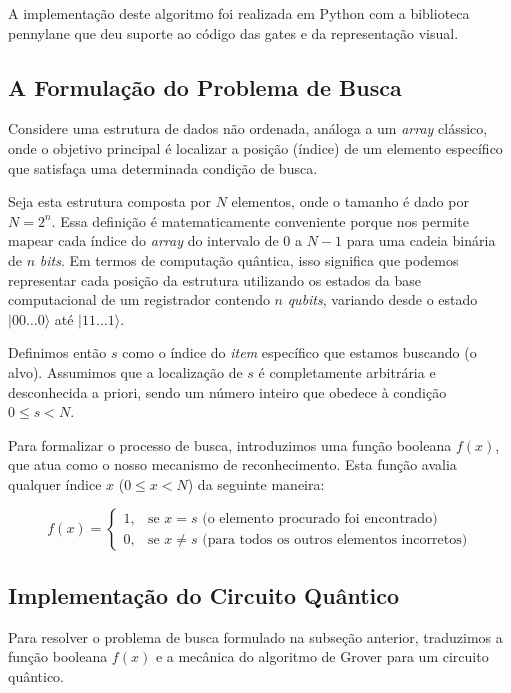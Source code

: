\documentclass{llncs}
\begin{document}
A implementação deste algoritmo foi realizada em Python com a biblioteca pennylane que deu suporte ao código das gates e da representação 
visual.

\subsection{A Formulação do Problema de Busca}

Considere uma estrutura de dados não ordenada, análoga a um \textit{array} clássico, onde o objetivo principal é localizar a posição (índice) de um elemento específico que satisfaça uma determinada condição de busca. 

Seja esta estrutura composta por $N$ elementos, onde o tamanho é dado por $N = 2^n$. Essa definição é matematicamente conveniente porque nos permite mapear cada índice do \textit{array}  do intervalo de $0$ a $N-1$ para uma cadeia binária de $n$ \textit{bits}. Em termos de computação quântica, isso significa que podemos representar cada posição da estrutura utilizando os estados da base computacional de um registrador contendo $n$ \textit{qubits}, variando desde o estado $|00\dots0\rangle$ até $|11\dots1\rangle$.

Definimos então $s$ como o índice do \textit{item} específico que estamos buscando (o alvo). Assumimos que a localização de $s$ é completamente arbitrária e desconhecida a priori, sendo um número inteiro que obedece à condição $0 \leq s < N$. 

Para formalizar o processo de busca, introduzimos uma função booleana $f(x)$, que atua como o nosso mecanismo de reconhecimento. Esta função avalia qualquer índice $x$ ($0 \leq x < N$) da seguinte maneira:

\begin{equation}
    f(x) = 
    \begin{cases} 
        1, & \text{se } x = s \text{ (o elemento procurado foi encontrado)} \\ 
        0, & \text{se } x \neq s \text{ (para todos os outros elementos incorretos)} 
    \end{cases}
\end{equation}

\subsection{Implementação do Circuito Quântico}

Para resolver o problema de busca formulado na subseção anterior, traduzimos a função booleana $f(x)$ e a mecânica do algoritmo de Grover para um circuito quântico. 
\end{document}
